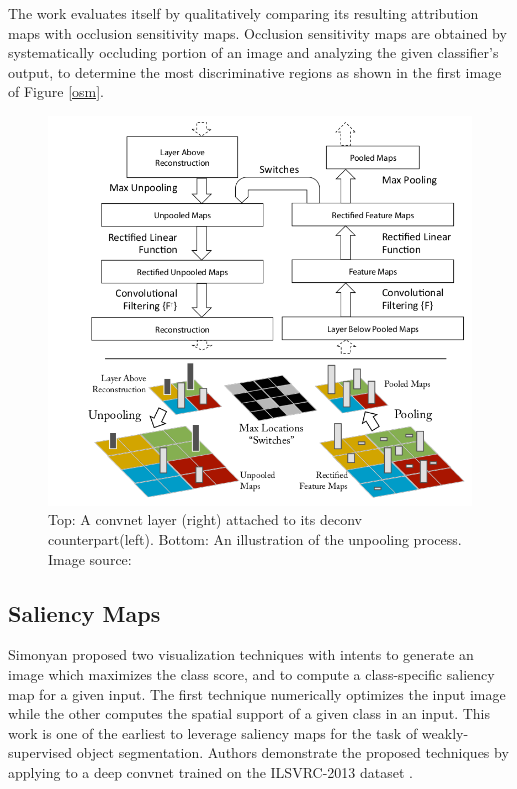 \documentclass[../report.tex]{subfiles}
\begin{document}
    
    The work evaluates itself by qualitatively comparing its resulting attribution maps with occlusion sensitivity maps. Occlusion sensitivity maps are obtained by systematically occluding portion of an image and analyzing the given classifier’s output, to determine the most discriminative regions as shown in the first image of Figure \ref{osm}.

    \begin{figure}[H]
    	\includegraphics[width=\textwidth]{images/chapter3/deconv_crop.png}
    	\caption{Top: A convnet layer (right) attached to its deconv counterpart(left). Bottom: An illustration of the unpooling process. Image source: \cite{matthew2014visualizing}}
    	\label{fig_deconv}
    \end{figure}
    
    
 \subsection{Saliency Maps}
 Simonyan \etal \cite{simonyan2013deep} proposed two visualization techniques with intents to generate an image which maximizes the class score, and to compute a class-specific saliency map for a given input. The first technique numerically optimizes the input image while the other computes the spatial support of a given class in an input. This work is one of the earliest to leverage saliency maps for the task of weakly-supervised object segmentation. Authors demonstrate the proposed techniques by applying to a deep convnet trained on the ILSVRC-2013 dataset \cite{ILSVRC15}.
 
\end{document}

